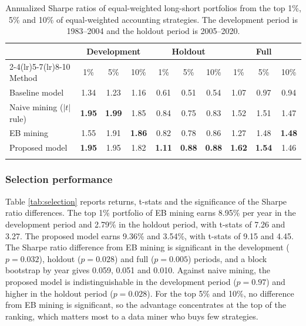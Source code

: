 \documentclass[pdflatex,sn-mathphys-num]{sn-jnl}%
\theoremstyle{thmstyleone}%
\theoremstyle{thmstyletwo}%
\theoremstyle{thmstylethree}%
\begin{document}
\begin{table}[h]
\caption{Annualized Sharpe ratios of equal-weighted long-short portfolios from the top 1\%, 5\% and 10\% of equal-weighted accounting strategies. The development period is 1983--2004 and the holdout period is 2005--2020.}\label{tab:sharpe}%
\small
\begin{tabular}{@{}lccccccccc@{}}
\toprule
 & \multicolumn{3}{c}{Development} & \multicolumn{3}{c}{Holdout} & \multicolumn{3}{c}{Full} \\
\cmidrule(lr){2-4}\cmidrule(lr){5-7}\cmidrule(lr){8-10}
Method & 1\% & 5\% & 10\% & 1\% & 5\% & 10\% & 1\% & 5\% & 10\% \\
\midrule
Baseline model & 1.34 & 1.23 & 1.16 & 0.61 & 0.51 & 0.54 & 1.07 & 0.97 & 0.94 \\
Naive mining ($|t|$ rule) & \textbf{1.95} & \textbf{1.99} & 1.85 & 0.84 & 0.75 & 0.83 & 1.52 & 1.51 & 1.47 \\
EB mining & 1.55 & 1.91 & \textbf{1.86} & 0.82 & 0.78 & 0.86 & 1.27 & 1.48 & \textbf{1.48} \\
Proposed model & \textbf{1.95} & 1.95 & 1.82 & \textbf{1.11} & \textbf{0.88} & \textbf{0.88} & \textbf{1.62} & \textbf{1.54} & 1.46 \\
\botrule
\end{tabular}
\end{table}

\subsubsection{Selection performance}
Table \ref{tab:selection} reports returns, t-stats and the significance of the Sharpe ratio differences. The top 1\% portfolio of EB mining earns 8.95\% per year in the development period and 2.79\% in the holdout period, with t-stats of 7.26 and 3.27. The proposed model earns 9.36\% and 3.54\%, with t-stats of 9.15 and 4.45. The Sharpe ratio difference from EB mining is significant in the development ($p = 0.032$), holdout ($p = 0.028$) and full ($p = 0.005$) periods, and a block bootstrap by year gives 0.059, 0.051 and 0.010. Against naive mining, the proposed model is indistinguishable in the development period ($p = 0.97$) and higher in the holdout period ($p = 0.028$). For the top 5\% and 10\%, no difference from EB mining is significant, so the advantage concentrates at the top of the ranking, which matters most to a data miner who buys few strategies.
\end{document}

